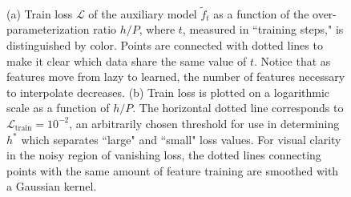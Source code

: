 \documentclass[11pt]{article}
\begin{document}
\begin{figure}[!h]
\centering

\captionsetup{width=.8\linewidth}
\\
\caption{(a) Train loss $\mathcal{L}$ of the auxiliary model $\tilde f_t$ as a function of the over-parameterization ratio $h/P$, where $t$, measured in ``training steps," is distinguished by color. Points are connected with dotted lines to make it clear which data share the same value of $t$. Notice that as features move from lazy to learned, the number of features necessary to interpolate decreases. (b) Train loss is plotted on a logarithmic scale as a function of $h/P$. The horizontal dotted line corresponds to $\mathcal L_\text{train} = 10^{-2}$, an arbitrarily chosen threshold for use in determining $h^*$ which separates ``large" and ``small" loss values. For visual clarity in the noisy region of vanishing loss, the dotted lines connecting points with the same amount of feature training are smoothed with a Gaussian kernel.}
\label{h/P_vs_train_loss}
\end{figure}
\end{document}
